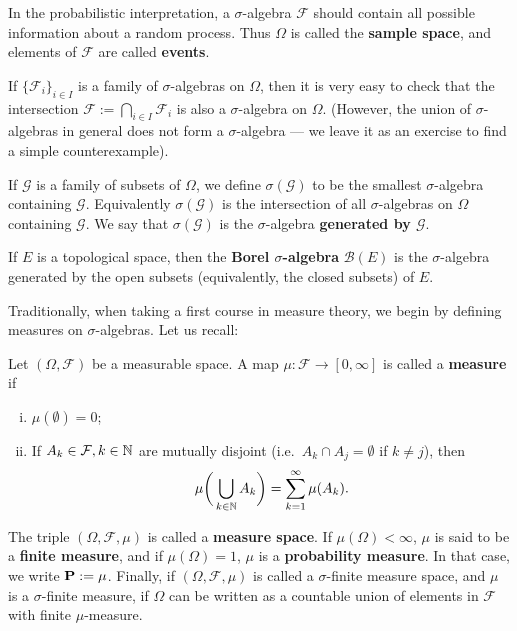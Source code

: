 In the probabilistic interpretation, a $\sigma$-algebra $\mathcal{F}$ should contain all possible information about a random process. Thus $\Omega$ is called the \textbf{sample space}, and elements of $\mathcal{F}$ are called \textbf{events}.

If $\{\mathcal{F}_i\}_{i\in I}$ is a family of $\sigma$-algebras on $\Omega$, then it is very easy to check that the intersection $\mathcal{F} := \bigcap_{i\in I}\mathcal{F}_i$ is also a $\sigma$-algebra on $\Omega$. (However, the union of $\sigma$-algebras in general does not form a $\sigma$-algebra --- we leave it as an exercise to find a simple counterexample).

\begin{definition}
If $\mathcal{G}$ is a family of subsets of $\Omega$, we define $\sigma(\mathcal{G})$ to be the smallest $\sigma$-algebra containing $\mathcal{G}$. Equivalently $\sigma(\mathcal{G})$ is the intersection of all $\sigma$-algebras on $\Omega$ containing $\mathcal{G}$. We say that $\sigma(\mathcal{G})$ is the $\sigma$-algebra \textbf{generated by $\mathcal{G}$}.   
\end{definition}

\begin{example}
If $E$ is a topological space, then the \textbf{Borel $\sigma$-algebra} $\mathscr{B}(E)$ is the $\sigma$-algebra generated by the open subsets (equivalently, the closed subsets) of $E$.
\end{example}

Traditionally, when taking a first course in measure theory, we begin by defining measures on $\sigma$-algebras. Let us recall:
\begin{definition}
Let $(\Omega,\mathcal{F})$ be a measurable space. A map $\mu:\mathcal{F} \to [0,\infty]$ is called a \textbf{measure} if
\begin{enumerate}[(i)]
    \item $\mu(\emptyset)=0$;
    \item If $A_k \in\mathcal{F}, k\in\mathbb{N}$ are mutually disjoint (i.e.\ $A_k\cap A_j = \emptyset$ if $k\ne j$), then
    \begin{equation*}
        \mu\bigg(\bigcup_{k\in\mathbb{N}}A_k\bigg) = \sum_{k=1}^\infty \mu(A_k).
    \end{equation*}
\end{enumerate}
The triple $(\Omega,\mathcal{F},\mu)$ is called a \textbf{measure space}. If $\mu(\Omega)<\infty$, $\mu$ is said to be a \textbf{finite measure}, and if $\mu(\Omega)=1$, $\mu$ is a \textbf{probability measure}. In that case, we write $\mathbf{P}:=\mu$. Finally, if $(\Omega,\mathcal{F},\mu)$ is called a $\sigma$-finite measure space, and $\mu$ is a $\sigma$-finite measure, if $\Omega$ can be written as a countable union of elements in $\mathcal{F}$ with finite $\mu$-measure.
\end{definition}

